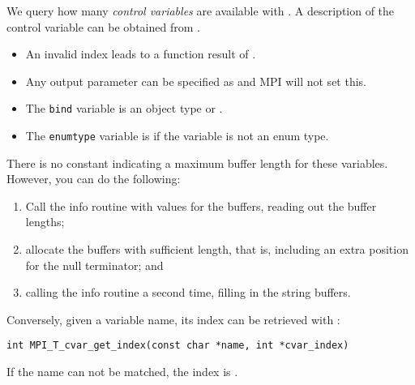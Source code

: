 We query how many \emph{control variables} are available
with .
%
A description of the control variable can be obtained
from .
\begin{itemize}
\item
  An invalid index leads to a function result of .
\item
  Any output parameter can be specified as 
  and MPI will not set this.
\item
  The \lstinline{bind} variable is an object type or .
\item
  The \lstinline{enumtype} variable is  if the variable
  is not an enum type.
\end{itemize}
\begin{remark}
  There is no constant indicating a maximum buffer length for these variables.
  However, you can do the following:
  \begin{enumerate}
  \item Call the info routine with  values for the buffers,
    reading out the buffer lengths;
  \item allocate the buffers with sufficient length, that is,
    including an extra position for the null terminator; and
  \item calling the info routine a second time, filling in the string buffers.
  \end{enumerate}
\end{remark}

Conversely, given a variable name, its index can be retrieved with
:
\begin{lstlisting}
int MPI_T_cvar_get_index(const char *name, int *cvar_index)
\end{lstlisting}
If the name can not be matched, the index is .

